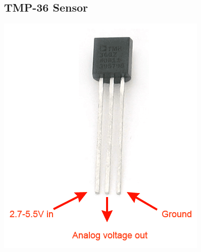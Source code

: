 \documentclass[a4paper,12pt,twoside,openright,titlepage]{book}
\begin{document}
\subsection{TMP-36 Sensor}
\begin{center}
\includegraphics[scale=0.8]{TMP-36}
\end{center}
\end{document}
